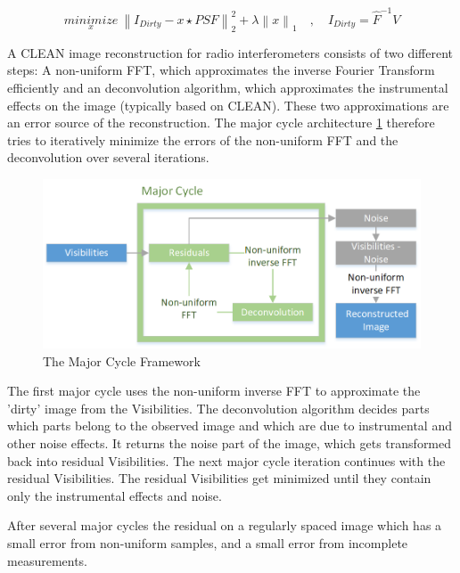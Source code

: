 \begin{equation}\label{intro:clean}
\underset{x}{minimize} \: \left \|  I_{Dirty} - x \star PSF \right \|_2^2 + \lambda \left \| x \right \|_1 \quad, \quad I_{Dirty} = \hat{F}^{-1} V
\end{equation}



A CLEAN image reconstruction for radio interferometers consists of two different steps: A non-uniform FFT, which approximates the inverse Fourier Transform efficiently and an deconvolution algorithm, which approximates the instrumental effects on the image (typically based on CLEAN). These two approximations are an error source of the reconstruction. The major cycle architecture \ref{intro:major} therefore tries to iteratively minimize the errors of the non-uniform FFT and the deconvolution over several iterations.

\begin{figure}
	\centering
	\vspace{-10pt}
	\includegraphics[width=1.0\linewidth]{./chapters/01.intro/Major-Minor.png}
	\caption{The Major Cycle Framework}
	\label{intro:major}
	\vspace{-10pt}
\end{figure}

The first major cycle uses the non-uniform inverse FFT to approximate the 'dirty' image from the Visibilities. The deconvolution algorithm decides parts which parts belong to the observed image and which are due to instrumental and other noise effects. It returns the noise part of the image, which gets transformed back into residual Visibilities. The next major cycle iteration continues with the residual Visibilities. The residual Visibilities get minimized until they contain only the instrumental effects and noise.

After several major cycles the residual  on a regularly spaced image which has a small error from non-uniform samples, and a small error from incomplete measurements.

